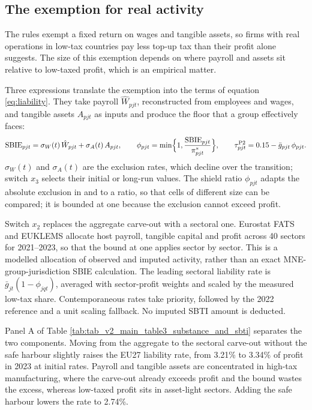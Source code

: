 \documentclass[11pt,a4paper]{article}
\begin{document}
\subsection{The exemption for real activity}\label{sec:substance}

The rules exempt a fixed return on wages and tangible assets, so firms with real operations in low-tax countries pay less top-up tax than their profit alone suggests. The size of this exemption depends on where payroll and assets sit relative to low-taxed profit, which is an empirical matter.

Three expressions translate the exemption into the terms of equation \eqref{eq:liability}. They take payroll $\hat W_{pjt}$, reconstructed from employees and wages, and tangible assets $A_{pjt}$ as inputs and produce the floor that a group effectively faces:
\begin{equation}\label{eq:sbie}
\mathrm{SBIE}_{pjt}=\sigma_W(t)\,\hat W_{pjt}+\sigma_A(t)\,A_{pjt},\qquad
\phi_{pjt}=\min\Bigl\{1,\frac{\mathrm{SBIE}_{pjt}}{\pi^{*}_{pjt}}\Bigr\},\qquad
\tau^{\mathrm{P2}}_{pjt}=0.15-\bar g_{pjt}\,\phi_{pjt}.
\end{equation}
$\sigma_W(t)$ and $\sigma_A(t)$ are the exclusion rates, which decline over the transition; switch $x_3$ selects their initial or long-run values. The shield ratio $\phi_{pjt}$ adapts the absolute exclusion in \citet{devereux2023} and \citet{hugger2026} to a ratio, so that cells of different size can be compared; it is bounded at one because the exclusion cannot exceed profit.

Switch $x_2$ replaces the aggregate carve-out with a sectoral one. Eurostat FATS and EUKLEMS allocate host payroll, tangible capital and profit across 40 sectors for 2021–2023, so that the bound at one applies sector by sector. This is a modelled allocation of observed and imputed activity, rather than an exact MNE-group-jurisdiction SBIE calculation. The leading sectoral liability rate is $\bar g_{jt}(1-\phi_{jqt})$, averaged with sector-profit weights and scaled by the measured low-tax share. Contemporaneous rates take priority, followed by the 2022 reference and a unit scaling fallback. No imputed SBTI amount is deducted.



Panel A of Table \ref{tab:tab_v2_main_table3_substance_and_sbti} separates the two components. Moving from the aggregate to the sectoral carve-out without the safe harbour slightly raises the EU27 liability rate, from 3.21\% to 3.34\% of profit in 2023 at initial rates. Payroll and tangible assets are concentrated in high-tax manufacturing, where the carve-out already exceeds profit and the bound wastes the excess, whereas low-taxed profit sits in asset-light sectors. Adding the safe harbour lowers the rate to 2.74\%.
\end{document}

